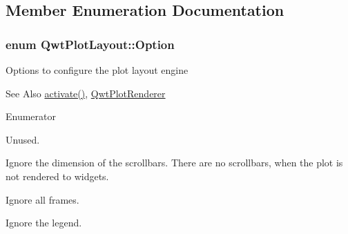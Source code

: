 \subsection{Member Enumeration Documentation}
\hypertarget{class_qwt_plot_layout_ad0d2d60e86a4c69ec105524041d5221d}{
\subsubsection[{Option}]{\setlength{\rightskip}{0pt plus 5cm}enum {\bf Qwt\-Plot\-Layout\-::\-Option}}}\label{class_qwt_plot_layout_ad0d2d60e86a4c69ec105524041d5221d}
Options to configure the plot layout engine \begin{DoxySeeAlso}{See Also}
\hyperlink{class_qwt_plot_layout_af940812bf4a9d94dac534734168d4ac8}{activate()}, \hyperlink{class_qwt_plot_renderer}{Qwt\-Plot\-Renderer} 
\end{DoxySeeAlso}
\begin{Desc}
\item[Enumerator]\par
\begin{description}
\item[{\em 
\hypertarget{class_qwt_plot_layout_ad0d2d60e86a4c69ec105524041d5221daf92cc90a2b68a8788a813807d379b95a}{Align\-Scales}\label{class_qwt_plot_layout_ad0d2d60e86a4c69ec105524041d5221daf92cc90a2b68a8788a813807d379b95a}
}]Unused. \item[{\em 
\hypertarget{class_qwt_plot_layout_ad0d2d60e86a4c69ec105524041d5221da813736a8e614f8f24db773081642b74c}{Ignore\-Scrollbars}\label{class_qwt_plot_layout_ad0d2d60e86a4c69ec105524041d5221da813736a8e614f8f24db773081642b74c}
}]Ignore the dimension of the scrollbars. There are no scrollbars, when the plot is not rendered to widgets. \item[{\em 
\hypertarget{class_qwt_plot_layout_ad0d2d60e86a4c69ec105524041d5221da9036bf7de40018a2f12d456a04949c6b}{Ignore\-Frames}\label{class_qwt_plot_layout_ad0d2d60e86a4c69ec105524041d5221da9036bf7de40018a2f12d456a04949c6b}
}]Ignore all frames. \item[{\em 
\hypertarget{class_qwt_plot_layout_ad0d2d60e86a4c69ec105524041d5221daa7237e2be1e8fc41a8b3156b57b95ed3}{Ignore\-Legend}\label{class_qwt_plot_layout_ad0d2d60e86a4c69ec105524041d5221daa7237e2be1e8fc41a8b3156b57b95ed3}
}]Ignore the legend. \end{description}
\end{Desc}



